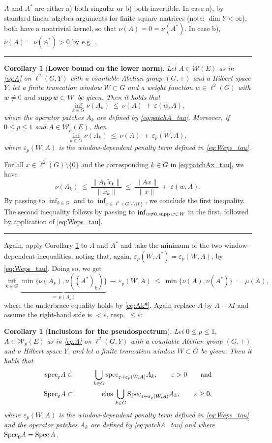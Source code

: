 \documentclass{article}
\newcommand\W{{\mathcal W}}
\newcommand\eps{{\varepsilon}}
\newcommand\specn{{\rm spec}}   %
\newcommand\speps{{\rm spec}_\eps}
\newcommand\Specn{{\rm Spec}}   %
\newcommand\Spec{{\rm Spec}\,}  %
\newcommand\Speps{{\rm Spec}_\eps}
\newcommand\clos{{\rm clos\,}}
\newcommand\supp{{\rm supp\,}}
\newtheorem{corollary}[theorem]{Corollary}
\newcommand\Proofend{\rule{2mm}{2mm}}
\renewenvironment{proof}
 {\par\noindent{\bf Proof.}}
 {\Proofend\par\pagebreak[2]}
\numberwithin{equation}{section}   %
\numberwithin{figure}{section}  %
\begin{document}
\begin{proof}
$A$ and $A^*$ are either a) both singular or b) both invertible. In case a), by standard linear algebra arguments for finite square matrices (note: $\dim Y<\infty$), both have a nontrivial kernel, so that $\nu(A)=0=\nu(A^*)$. In case b), $\nu(A)=\nu(A^*)>0$ by e.g. \cite[Lemma 2.10]{HagLiSei}.
\end{proof}

\begin{corollary}[\bf Lower bound on the lower norm] \label{cor:nu_tau}
Let $A\in \W(E)$ as in \eqref{eq:A} on $\ell^2(G,Y)$ with a countable Abelian group $(G,+)$ and a Hilbert space $Y$,
let a finite truncation window $W\subset G$ and a weight function $w\in\ell^2(G)$ with $w\neq 0$ and $\supp w\subset W$ be given. Then it holds that
\[
\inf_{k\in G}\nu(A_k)\ \le\ \nu(A)\ +\ \eps(w,A),
\]
where the operator patches $A_k$ are defined by \eqref{eq:patchA_tau}. 
Moreover, if $0\leq p\leq 1$ and $A\in \W_p(E)$, then
\[\inf_{k\in G}\nu(A_k)\ \le\ \nu(A)\ +\ \eps_p(W,A),\]
where $\eps_p(W,A)$ is the window-dependent penalty term defined in \eqref{eq:Weps_tau}. 
\end{corollary}
\begin{proof}
For all $x\in \ell^2(G)\setminus\{0\}$ and the corresponding $k\in G$ in \eqref{eq:patchAx_tau}, we have
\[
\nu(A_k)\ \le\ \frac{\|A_{k}\, \tilde x_{k}\|}{\| \tilde x_{k}\|}\ \le\ \frac{\|Ax\|}{\|x\|}\ +\ \eps(w,A).
\]
By passing to $\inf_{k\in G}$ and to $\inf_{x\in \ell^2(G)\setminus\{0\}}$, we conclude the first inequality. The second inequality follows by passing to $\inf_{w\ne 0, \supp w\subset W}$ in the first, followed by application of \eqref{eq:Weps_tau}.
\end{proof}
%
Again, apply Corollary \ref{cor:nu_tau} to $A$ and $A^*$ and take the minimum of the two window-dependent inequalities, noting that, again, $\eps_p(W,A^*)=\eps_p(W,A)$, by \eqref{eq:Weps_tau}. Doing so, we get
%
\begin{equation} \label{eq:nuAA*_tau}
\inf_{k\in G}\underbrace{\min\{\nu(A_k),\nu((A^*)_k)\}}_{=\,\mu(A_k)}\ -\ \eps_p(W,A)\ \le\ \min\{\nu(A),\nu(A^*)\}\ =\ \mu(A),
\end{equation}
where the underbrace equality holds by \eqref{eq:Ak*}. Again replace $A$ by $A-\lambda I$ and assume the right-hand side is $<\eps$, resp.~$\le\eps$:
%
\begin{corollary}[\bf Inclusions for the pseudospectrum] \label{cor:speps_tau}
Let $0\leq p\leq 1$, $A\in \W_p(E)$ as in \eqref{eq:A} on $\ell^2(G,Y)$ with a countable Abelian group $(G,+)$ and a Hilbert space $Y$, and
let a finite truncation window $W\subset G$ be given. Then it holds that
\begin{eqnarray}
\label{eq:tau-incl1}
\speps A&\subset& \qquad\bigcup\limits_{k\in G} \specn_{\eps+\eps_p(W,A)} A_k,\qquad \eps>0\qquad\text{and}\\[0mm]
\label{eq:tau-incl2}
\Speps A& \subset&  \clos\bigcup\limits_{k\in G} \Specn_{\eps+\eps_p(W,A)} A_k,\qquad \eps\ge 0,
\end{eqnarray}
where $\eps_p(W,A)$ is the window-dependent penalty term defined in \eqref{eq:Weps_tau} and the operator patches $A_k$ are defined by \eqref{eq:patchA_tau} and where $\Specn_0A=\Spec A$.
\end{corollary}
\end{document}
